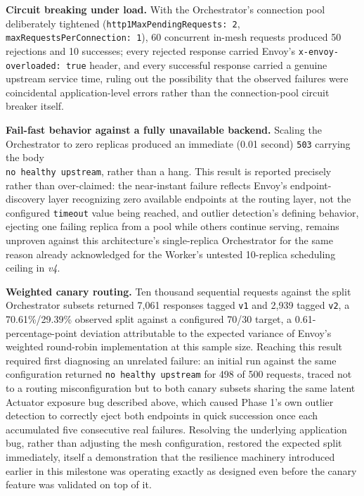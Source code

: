 \documentclass[twoside]{supsistudent}
\begin{document}
\textbf{Circuit breaking under load.} With the Orchestrator's connection pool deliberately tightened (\texttt{http1MaxPendingRequests: 2}, \texttt{maxRequestsPerConnection: 1}), 60 concurrent in-mesh requests produced 50 rejections and 10 successes; every rejected response carried Envoy's \texttt{x-envoy-overloaded: true} header, and every successful response carried a genuine upstream service time, ruling out the possibility that the observed failures were coincidental application-level errors rather than the connection-pool circuit breaker itself.

\textbf{Fail-fast behavior against a fully unavailable backend.} Scaling the Orchestrator to zero replicas produced an immediate (0.01 second) \texttt{503} carrying the body \\ \texttt{no healthy upstream}, rather than a hang. This result is reported precisely rather than over-claimed: the near-instant failure reflects Envoy's endpoint-discovery layer recognizing zero available endpoints at the routing layer, not the configured \texttt{timeout} value being reached, and outlier detection's defining behavior, ejecting one failing replica from a pool while others continue serving, remains unproven against this architecture's single-replica Orchestrator for the same reason already acknowledged for the Worker's untested 10-replica scheduling ceiling in \emph{v4}.

\textbf{Weighted canary routing.} Ten thousand sequential requests against the split Orchestrator subsets returned 7{,}061 responses tagged \texttt{v1} and 2{,}939 tagged \texttt{v2}, a 70.61\%/29.39\% observed split against a configured 70/30 target, a 0.61-percentage-point deviation attributable to the expected variance of Envoy's weighted round-robin implementation at this sample size. Reaching this result required first diagnosing an unrelated failure: an initial run against the same configuration returned \texttt{no healthy upstream} for 498 of 500 requests, traced not to a routing misconfiguration but to both canary subsets sharing the same latent Actuator exposure bug described above, which caused Phase 1's own outlier detection to correctly eject both endpoints in quick succession once each accumulated five consecutive real failures. Resolving the underlying application bug, rather than adjusting the mesh configuration, restored the expected split immediately, itself a demonstration that the resilience machinery introduced earlier in this milestone was operating exactly as designed even before the canary feature was validated on top of it.
\end{document}
